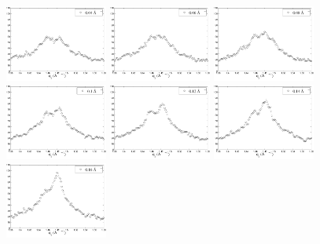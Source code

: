 \begin{figure}[htbp]
  \centering
  \includegraphics[width=0.3\textwidth]{figures/ripple/NGIWAXS/qrplot0}
  \includegraphics[width=0.3\textwidth]{figures/ripple/NGIWAXS/qrplot1}
  \includegraphics[width=0.3\textwidth]{figures/ripple/NGIWAXS/qrplot2}
  \includegraphics[width=0.3\textwidth]{figures/ripple/NGIWAXS/qrplot3}
  \includegraphics[width=0.3\textwidth]{figures/ripple/NGIWAXS/qrplot4}
  \includegraphics[width=0.3\textwidth]{figures/ripple/NGIWAXS/qrplot5}
  \includegraphics[width=0.3\textwidth]{figures/ripple/NGIWAXS/qrplot6}

\end{figure}
